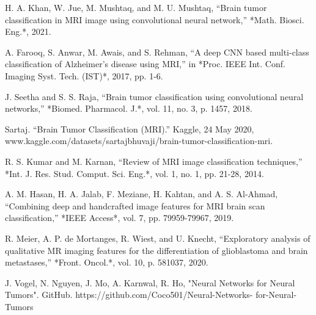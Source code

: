 \documentclass[conference]{IEEEtran}
\begin{document}
\begin{thebibliography}{00}

H. A. Khan, W. Jue, M. Mushtaq, and M. U. Mushtaq, “Brain tumor classification in MRI image using convolutional neural network,” *Math. Biosci. Eng.*, 2021. 

A. Farooq, S. Anwar, M. Awais, and S. Rehman, “A deep CNN based multi-class classification of Alzheimer's disease using MRI,” in *Proc. IEEE Int. Conf. Imaging Syst. Tech. (IST)*, 2017, pp. 1-6. 

J. Seetha and S. S. Raja, “Brain tumor classification using convolutional neural networks,” *Biomed. Pharmacol. J.*, vol. 11, no. 3, p. 1457, 2018.

Sartaj. “Brain Tumor Classification (MRI).” Kaggle, 24 May 2020, www.kaggle.com/datasets/sartajbhuvaji/brain-tumor-classification-mri. 

R. S. Kumar and M. Karnan, “Review of MRI image classification techniques,” *Int. J. Res. Stud. Comput. Sci. Eng.*, vol. 1, no. 1, pp. 21-28, 2014. 

A. M. Hasan, H. A. Jalab, F. Meziane, H. Kahtan, and A. S. Al-Ahmad, “Combining deep and handcrafted image features for MRI brain scan classification,” *IEEE Access*, vol. 7, pp. 79959-79967, 2019. 

R. Meier, A. P. de Mortanges, R. Wiest, and U. Knecht, “Exploratory analysis of qualitative MR imaging features for the differentiation of glioblastoma and brain metastases,” *Front. Oncol.*, vol. 10, p. 581037, 2020.

J. Vogel, N. Nguyen, J. Mo, A. Karnwal, R. Ho, "Neural Networks for Neural Tumors". GitHub. https://github.com/Coco501/Neural-Networks-
for-Neural-Tumors

\end{thebibliography}
\end{document}
